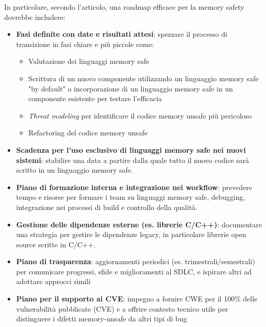 In particolare, secondo l'articolo, una roadmap efficace per la memory safety dovrebbe
includere:

\begin{itemize}
  \item \textbf{Fasi definite con date e risultati attesi}: spezzare il processo
    di transizione in fasi chiare e più piccole come:
    \begin{itemize}
      \item Valutazione dei linguaggi memory safe

      \item Scrittura di un nuovo componente utilizzando un linguaggio memory safe
        "by default" o incorporazione di un linguaggio memory safe in un componente
        esistente per testare l'efficacia

      \item \textit{Threat modeling} per identificare il codice memory unsafe
        più pericoloso

      \item Refactoring del codice memory unsafe
    \end{itemize}

  \item \textbf{Scadenza per l'uso esclusivo di linguaggi memory safe nei nuovi
    sistemi}: stabilire una data a partire dalla quale tutto il nuovo codice sarà
    scritto in un linguaggio memory safe.

  \item \textbf{Piano di formazione interna e integrazione nei workflow}: prevedere
    tempo e risorse per formare i team su linguaggi memory safe, debugging, integrazione
    nei processi di build e controllo della qualità.

  \item \textbf{Gestione delle dipendenze esterne (es. librerie C/C++)}: documentare
    una strategia per gestire le dipendenze legacy, in particolare librerie open
    source scritte in C/C++.

  \item \textbf{Piano di trasparenza}: aggiornamenti periodici (es. trimestrali/semestrali)
    per comunicare progressi, sfide e miglioramenti al SDLC, e ispirare altri ad
    adottare approcci simili

  \item \textbf{Piano per il supporto ai CVE}: impegno a fornire CWE per il 100\%
    delle vulnerabilità pubblicate (CVE) e a offrire contesto tecnico utile per
    distinguere i difetti memory-unsafe da altri tipi di bug
\end{itemize}

